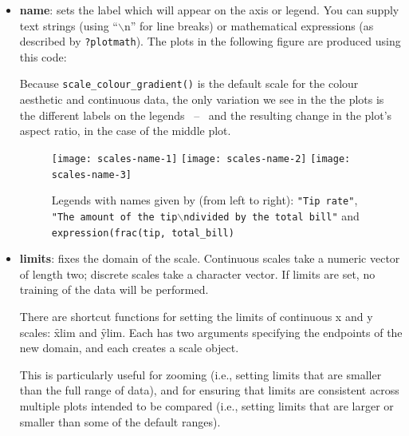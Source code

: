 \begin{itemize}
  \item {\bf name}:  sets the label which will appear on the axis or legend. You can supply text strings (using ``$\backslash$n'' for line breaks) or mathematical expressions (as described by \verb|?plotmath|).  The plots in the following figure are produced using this code:


Because {\tt scale\_colour\_gradient()} is the default scale for the colour aesthetic and continuous data, the only variation we see in the the plots is the different labels on the legends ~--~ and the resulting change in the plot's aspect ratio, in the case of the middle plot.

  \begin{figure}[htbp]
    \centering
      \texttt{[image: scales-name-1]}%
      \texttt{[image: scales-name-2]}%
      \texttt{[image: scales-name-3]}
    \caption{Legends with names given by (from left to right): {\tt "Tip rate"}, {\tt "The amount of the tip$\backslash$ndivided by the total bill"} and {\tt expression(frac(tip, total\_bill)} }
    \label{fig:legend-names}
  \end{figure}
  

  \item {\bf limits}: fixes the domain of the scale.   Continuous scales take a numeric vector of length two; discrete scales take a character vector. If limits are set, no training of the data will be performed.  
  
  There are shortcut functions for setting the limits of continuous x and y scales: \f{xlim} and \f{ylim}.  Each has two arguments specifying the endpoints of the new domain, and each creates a scale object.  
  
  This is particularly useful for zooming (i.e., setting limits that are smaller than the full range of data), and for ensuring that limits are consistent across multiple plots intended to be compared (i.e., setting limits that are larger or smaller than some of the default ranges).  
  

\end{itemize}
